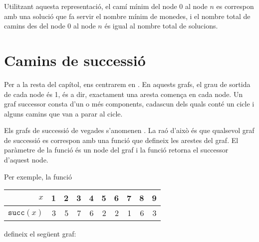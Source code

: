 Utilitzant aquesta representació, el camí mínim del node 0 al node $n$
es correspon amb una solució que fa servir el nombre mínim de monedes,
i el nombre total de camins des del node 0 al node $n$ és igual al
nombre total de solucions.

\section{Camins de successió}

 
\label{camins-de-successio}

Per a la resta del capítol, ens centrarem en . En aquests grafs, el grau de sortida de cada node és 1,
és a dir, exactament una aresta comença en cada node. Un graf
successor consta d'un o més components, cadascun dels quals conté un
cicle i alguns camins que van a parar al cicle.

Els grafs de successió de vegades s'anomenen . La raó d'això és que qualsevol graf de successió es
correspon amb una funció que defineix les arestes del graf. El
paràmetre de la funció és un node del graf i la funció retorna el
successor d'aquest node.

Per exemple, la funció
\begin{center}
\begin{tabular}{r|rrrrrrrrr}
$x$ & 1 & 2 & 3 & 4 & 5 & 6 & 7 & 8 & 9 \\
\hline
$\texttt{succ}(x)$ & 3 & 5 & 7 & 6 & 2 & 2 & 1 & 6 & 3 \\
\end{tabular}
\end{center}
defineix el següent graf:
\begin{center}
\end{center}


